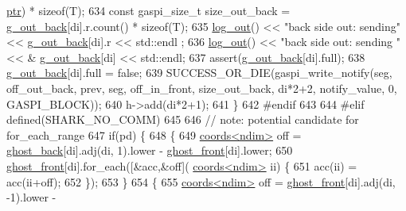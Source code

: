 \begin{DoxyCode}
      \hyperlink{classshark_1_1ndim_1_1_global_array_ad4af3b8307a3a7107186cf699b5a2432}{ptr}) * \textcolor{keyword}{sizeof}(T);
634                     \textcolor{keyword}{const} gaspi\_size\_t size\_out\_back   = \hyperlink{classshark_1_1ndim_1_1_global_array_a1f7c189d498d7e7c1c79d9a613d1c5a9}{g\_out\_back}[di].r.count() * \textcolor{keyword}{sizeof}(T);
635                     \hyperlink{classshark_1_1ndim_1_1_global_array_ae56b93f4ac19003102749015275a6d0c}{log\_out}() << \textcolor{stringliteral}{"back side out: sending"} << \hyperlink{classshark_1_1ndim_1_1_global_array_a1f7c189d498d7e7c1c79d9a613d1c5a9}{g\_out\_back}[di].r << std::endl
      ;
636                     \hyperlink{classshark_1_1ndim_1_1_global_array_ae56b93f4ac19003102749015275a6d0c}{log\_out}() << \textcolor{stringliteral}{"back side out:  sending "} << &
      \hyperlink{classshark_1_1ndim_1_1_global_array_a1f7c189d498d7e7c1c79d9a613d1c5a9}{g\_out\_back}[di] << std::endl;
637                     assert(\hyperlink{classshark_1_1ndim_1_1_global_array_a1f7c189d498d7e7c1c79d9a613d1c5a9}{g\_out\_back}[di].full);
638                     \hyperlink{classshark_1_1ndim_1_1_global_array_a1f7c189d498d7e7c1c79d9a613d1c5a9}{g\_out\_back}[di].full = \textcolor{keyword}{false};
639                     SUCCESS\_OR\_DIE(gaspi\_write\_notify(seg, off\_out\_back, prev, seg, off\_in\_front, 
      size\_out\_back, di*2+2, notify\_value, 0, GASPI\_BLOCK));
640                     h->add(di*2+1);
641                 \}
642 \textcolor{preprocessor}{#endif}
643                
644 \textcolor{preprocessor}{#elif defined(SHARK\_NO\_COMM)}
645 
646                 \textcolor{comment}{// note: potential candidate for for\_each\_range}
647                 \textcolor{keywordflow}{if}(pd) \{
648                     \{
649                         \hyperlink{structshark_1_1ndim_1_1coords}{coords<ndim>} off = \hyperlink{classshark_1_1ndim_1_1_global_array_a97eb47a8cd80d98627706e673259a310}{ghost\_back}[di].adj(di, 1).lower - 
      \hyperlink{classshark_1_1ndim_1_1_global_array_a48ce861293f294f003ef16ebd49eb942}{ghost\_front}[di].lower;
650                         \hyperlink{classshark_1_1ndim_1_1_global_array_a48ce861293f294f003ef16ebd49eb942}{ghost\_front}[di].for\_each([&acc,&off](
      \hyperlink{structshark_1_1ndim_1_1coords}{coords<ndim>} ii) \{
651                                 acc(ii) = acc(ii+off);
652                                 \});
653                     \}
654                     \{
655                         \hyperlink{structshark_1_1ndim_1_1coords}{coords<ndim>} off = \hyperlink{classshark_1_1ndim_1_1_global_array_a48ce861293f294f003ef16ebd49eb942}{ghost\_front}[di].adj(di, -1).lower - 

\end{DoxyCode}
